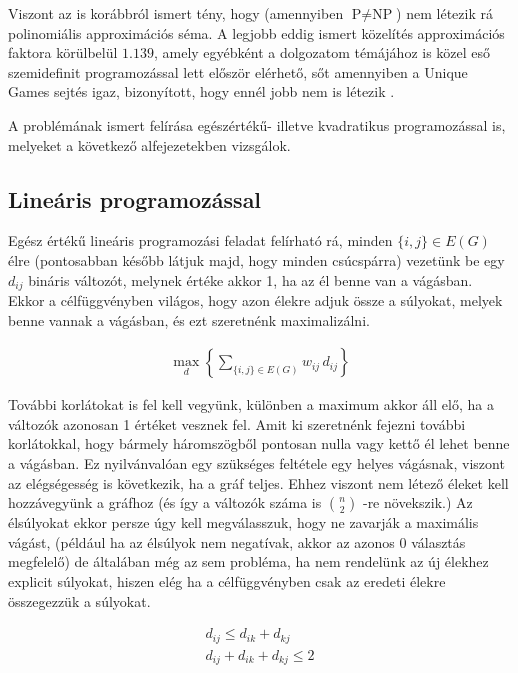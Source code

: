 Viszont az is korábbról ismert tény, hogy (amennyiben $\text{P} \neq \text{NP}$) nem létezik rá polinomiális approximációs séma. A legjobb eddig ismert közelítés approximációs faktora körülbelül $1.139$, amely egyébként a dolgozatom témájához is közel eső szemidefinit programozással lett először elérhető, sőt amennyiben a Unique Games sejtés igaz, bizonyított, hogy ennél jobb nem is létezik \cite{10.1145/227683.227684, wiki:Maximum_cut}.

A problémának ismert felírása egészértékű- illetve kvadratikus programozással is, melyeket a következő alfejezetekben vizsgálok.

\subsection{Lineáris programozással}\label{sec:theoryMaxCutLP}

Egész értékű lineáris programozási feladat felírható rá, minden $\{i,j\} \in E(G)$ élre (pontosabban később látjuk majd, hogy minden csúcspárra) vezetünk be egy $d_{ij}$ bináris változót, melynek értéke akkor 1, ha az él benne van a vágásban. Ekkor a célfüggvényben világos, hogy azon élekre adjuk össze a súlyokat, melyek benne vannak a vágásban, és ezt szeretnénk maximalizálni.

\begin{align}
	\max_{d} \left\{ \sum_{\{i,j\}\in E(G)}{w_{ij} \, d_{ij}}\right\}
\end{align}

További korlátokat is fel kell vegyünk, különben a maximum akkor áll elő, ha a változók azonosan 1 értéket vesznek fel.
Amit ki szeretnénk fejezni további korlátokkal, hogy bármely háromszögből pontosan nulla vagy kettő él lehet benne a vágásban. Ez nyilvánvalóan egy szükséges feltétele egy helyes vágásnak, viszont az elégségesség is következik, ha a gráf teljes. Ehhez viszont nem létező éleket kell hozzávegyünk a gráfhoz (és így a változók száma is $\binom{n}{2}$ -re növekszik.) Az élsúlyokat ekkor persze úgy kell megválasszuk, hogy ne zavarják a maximális vágást, (például ha az élsúlyok nem negatívak, akkor az azonos 0 választás megfelelő) de általában még az sem probléma, ha nem rendelünk az új élekhez explicit súlyokat, hiszen elég ha a célfüggvényben csak az eredeti élekre összegezzük a súlyokat.

\begin{align}
 d_{ij} \leq d_{ik}+d_{kj}  \\
 d_{ij}+d_{ik}+d_{kj} \leq 2  
\end{align}

